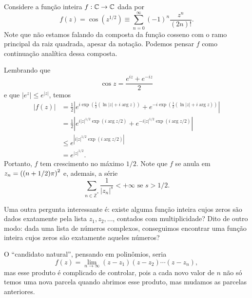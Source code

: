     \begin{exemplo}
        Considere a função inteira $f:\mathbb{C}\to\mathbb{C}$ dada por
        \begin{equation*}
            f(z) = \cos(z^{1/2}) \equiv \sum_{n=0}^{\infty} (-1)^n \frac{z^n}{(2n)!}.
        \end{equation*}
        Note que não estamos falando da composta da função cosseno com o ramo
        principal da raiz quadrada, apesar da notação. Podemos pensar $f$ como
        continuação analítica dessa composta.
        
        Lembrando que
        \begin{equation*}
            \cos z = \frac{e^{iz} + e^{-iz}}{2}
        \end{equation*}
        e que $|e^z| \leq e^{|z|}$, temos
        \begin{align*}
            |f(z)| &= \frac{1}{2}\left| 
            e^{i\exp\left(\frac{1}{2}(\ln|z| + i\arg z)\right)} 
            + e^{-i\exp\left(\frac{1}{2}(\ln|z| + i\arg z)\right)} \right| \\
            &= \frac{1}{2}\left| e^{i|z|^{1/2}\exp(i\arg z/2)} 
            + e^{-i|z|^{1/2}\exp(i\arg z/2)} \right| \\
            &\leq e^{ \left| i|z|^{1/2}\exp(i\arg z/2) \right| } \\
            &= e^{|z|^{1/2}}.
        \end{align*}
        Portanto, $f$ tem crescimento no máximo $1/2$. Note que $f$ se anula em
        $z_n = \displaystyle \left( (n+1/2)\pi \right)^2 $ e, ademais, a série
        \begin{equation*}
            \sum_{n\in\mathbb{Z}^*} \frac{1}{|z_n|^s} < +\infty \text{ se } s > 1/2.
        \end{equation*}
    \end{exemplo}
    Uma outra pergunta interessante é: existe alguma função inteira cujos zeros são
    dados exatamente pela lista $z_1, z_2, \dots$, contados com multiplicidade? Dito
    de outro modo: dada uma lista de números complexos, conseguimos encontrar uma 
    função inteira cujos zeros são exatamente aqueles números?
    
    O ``candidato natural'', pensando em polinômios, seria
    \begin{equation*}
        f(z) = \lim_{n\to\infty} (z-z_1)(z-z_2)\cdots(z - z_n),
    \end{equation*}
    mas esse produto é complicado de controlar, pois a cada novo valor de $n$ não
    só temos uma nova parcela quando abrimos esse produto, mas mudamos as parcelas
    anteriores.
    
